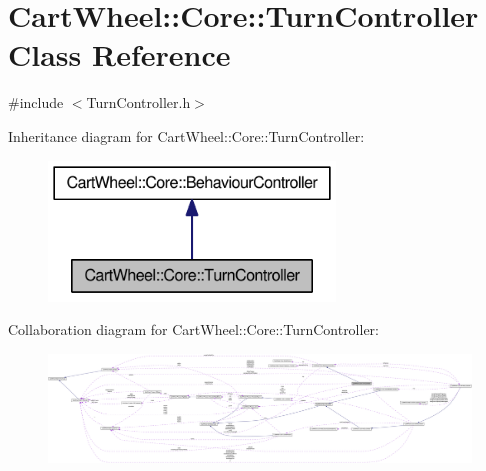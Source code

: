 \hypertarget{classCartWheel_1_1Core_1_1TurnController}{
\section{CartWheel::Core::TurnController Class Reference}
\label{classCartWheel_1_1Core_1_1TurnController}
}


{\ttfamily \#include $<$TurnController.h$>$}



Inheritance diagram for CartWheel::Core::TurnController:\nopagebreak
\begin{figure}[H]
\begin{center}
\leavevmode
\includegraphics[width=216pt]{classCartWheel_1_1Core_1_1TurnController__inherit__graph}
\end{center}
\end{figure}


Collaboration diagram for CartWheel::Core::TurnController:\nopagebreak
\begin{figure}[H]
\begin{center}
\leavevmode
\includegraphics[width=400pt]{classCartWheel_1_1Core_1_1TurnController__coll__graph}
\end{center}
\end{figure}
